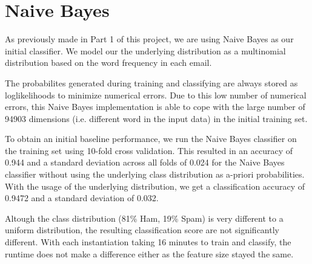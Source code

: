 \section{Naive Bayes}
As previously made in Part 1 of this project, we are using Naive Bayes as our initial classifier.
We model our the underlying distribution as a multinomial distribution based on the word frequency in each email.

The probabilites generated during training and classifying are always stored as loglikelihoods to minimize numerical errors.
Due to this low number of numerical errors, this Naive Bayes implementation is able to cope with the large number of 94903 dimensions (i.e. different word in the input data) in the initial training set.

To obtain an initial baseline performance, we run the Naive Bayes classifier on the training set using 10-fold cross validation.
This resulted in an accuracy of 0.944 and a standard deviation across all folds of 0.024 for the Naive Bayes classifier without using the underlying class distribution as a-priori probabilities.
With the usage of the underlying distribution, we get a classification accuracy of 0.9472 and a standard deviation of 0.032.

Altough the class distribution (81\% Ham, 19\% Spam) is very different to a uniform distribution, the resulting classification score are not significantly different.
With each instantiation taking 16 minutes to train and classify, the runtime does not make a difference either as the feature size stayed the same.

